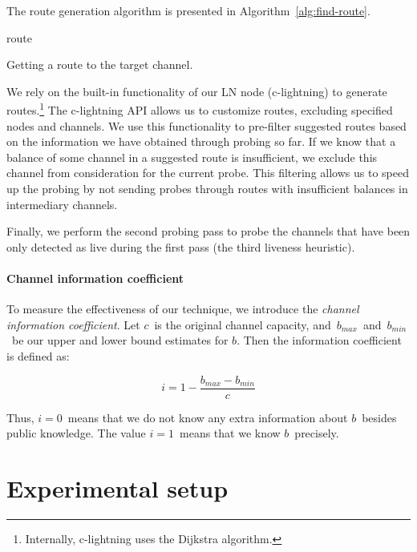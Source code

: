 The route generation algorithm is presented in Algorithm~\ref{alg:find-route}.

\begin{algorithm}
	 {
	}
	\Return route\;
	\caption{Getting a route to the target channel.}
	\label{alg:find-route}
\end{algorithm}

We rely on the built-in functionality of our LN node (c-lightning) to generate routes.\footnote{Internally, c-lightning uses the Dijkstra algorithm.}
The c-lightning API allows us to customize routes, excluding specified nodes and channels.
We use this functionality to pre-filter suggested routes based on the information we have obtained through probing so far.
If we know that a balance of some channel in a suggested route is insufficient, we exclude this channel from consideration for the current probe.
This filtering allows us to speed up the probing by not sending probes through routes with insufficient balances in intermediary channels.

Finally, we perform the second probing pass to probe the channels that have been only detected as live during the first pass (the third liveness heuristic).

\paragraph{Channel information coefficient}
To measure the effectiveness of our technique, we introduce the \textit{channel information coefficient}.
Let $c$~is the original channel capacity, and~$b_{max}$~and~$b_{min}$~be our upper and lower bound estimates for $b$.
Then the information coefficient is defined as:

\[i = 1 - \frac{b_{max} - b_{min}}{c}\]

Thus, $i = 0$~means that we do not know any extra information about $b$~besides public knowledge.
The value $i = 1$~means that we know $b$~precisely.


\section{Experimental setup}

